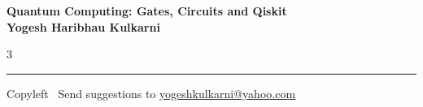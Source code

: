 \documentclass[8pt,landscape]{article}
\begin{document}
\footnotesize

\begin{center}
\Large{\textbf{Quantum Computing: Gates, Circuits and Qiskit\\ Yogesh Haribhau Kulkarni}}
\end{center}

\begin{multicols}{3}

\end{multicols}

\rule{\linewidth}{0.25pt}
\scriptsize
Copyleft \textcopyleft\  Send suggestions to
\href{http://www.yogeshkulkarni.com}{yogeshkulkarni@yahoo.com}
\end{document}
